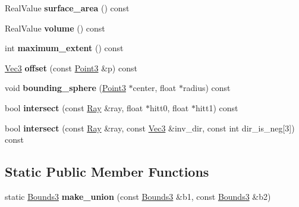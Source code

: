 \begin{DoxyCompactItemize}
Real\+Value {\bfseries surface\+\_\+area} () const
\item 
\mbox{\label{classomg_1_1_bounds3_a71e65adcee53a048b8395b7945ba2375}} 
Real\+Value {\bfseries volume} () const
\item 
\mbox{\label{classomg_1_1_bounds3_abf43afaa58bd26bcf277138771a3430a}} 
int {\bfseries maximum\+\_\+extent} () const
\item 
\mbox{\label{classomg_1_1_bounds3_afd87f094095c32ba4f5649feb1ed6413}} 
\mbox{\hyperlink{namespaceomg_a45a9482677fee9933ff369b49894e316}{Vec3}} {\bfseries offset} (const \mbox{\hyperlink{namespaceomg_af85242d35fdacf829d32a6f9b95f3e35}{Point3}} \&p) const
\item 
\mbox{\label{classomg_1_1_bounds3_a9afb08e8aafb6ac6a65d261fbc5a9349}} 
void {\bfseries bounding\+\_\+sphere} (\mbox{\hyperlink{namespaceomg_af85242d35fdacf829d32a6f9b95f3e35}{Point3}} $\ast$center, float $\ast$radius) const
\item 
\mbox{\label{classomg_1_1_bounds3_ad42f34001ab7ea54d10c301ade82c0f3}} 
bool {\bfseries intersect} (const \mbox{\hyperlink{classomg_1_1_ray}{Ray}} \&ray, float $\ast$hitt0, float $\ast$hitt1) const
\item 
\mbox{\label{classomg_1_1_bounds3_a6ec2a8a13093abb383698bca06d6ba1b}} 
bool {\bfseries intersect} (const \mbox{\hyperlink{classomg_1_1_ray}{Ray}} \&ray, const \mbox{\hyperlink{namespaceomg_a45a9482677fee9933ff369b49894e316}{Vec3}} \&inv\+\_\+dir, const int dir\+\_\+is\+\_\+neg\mbox{[}3\mbox{]}) const
\end{DoxyCompactItemize}
\subsection*{Static Public Member Functions}
\begin{DoxyCompactItemize}
\item 
\mbox{\label{classomg_1_1_bounds3_a37db28c7c318a9185ecd26d4c0c517b8}} 
static \mbox{\hyperlink{classomg_1_1_bounds3}{Bounds3}} {\bfseries make\+\_\+union} (const \mbox{\hyperlink{classomg_1_1_bounds3}{Bounds3}} \&b1, const \mbox{\hyperlink{classomg_1_1_bounds3}{Bounds3}} \&b2)
\end{DoxyCompactItemize}
